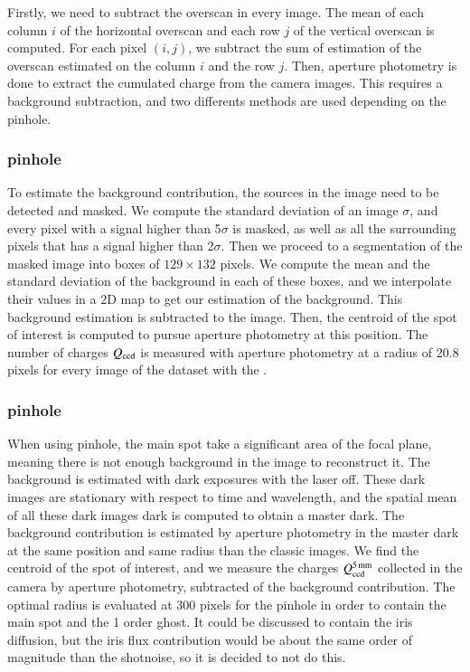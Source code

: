 Firstly, we need to subtract the overscan in every image. The mean of each column $i$ of the horizontal overscan and each row $j$ of the vertical overscan is computed. For each pixel $(i, j)$, we subtract the sum of estimation of the overscan estimated on the column $i$ and the row $j$.
Then, aperture photometry is done to extract the cumulated charge from the \SD camera images. This requires a background subtraction, and two differents methods are used depending on the pinhole.

\subsubsection{\spinhole pinhole}

To estimate the background contribution, the sources in the image need to be detected and masked. We compute the standard deviation of an image $\sigma$, and every pixel with a signal higher than 5$\sigma$ is masked, as well as all the surrounding pixels that has a signal higher than 2$\sigma$. Then we proceed to a segmentation of the masked image into boxes of $129\times132$ pixels. We compute the mean and the standard deviation of the background in each of these boxes, and we interpolate their values in a 2D map to get our estimation of the background. This background estimation is subtracted to the image. Then, the centroid of the spot of interest is computed to pursue aperture photometry at this position. The number of charges $Q_{\mathrm{ccd}}$ is measured with aperture photometry at a radius of 20.8 pixels for every image of the dataset with the \spinhole.

\subsubsection{\bpinhole pinhole}

When using \bpinhole pinhole, the main spot take a significant area of the focal plane, meaning there is not enough background in the image to reconstruct it. The background is estimated with dark exposures with the laser off. These dark images are stationary with respect to time and wavelength, and the spatial mean of all these dark images dark is computed to obtain a master dark. The background contribution is estimated by aperture photometry in the master dark at the same position and same radius than the classic images. We find the centroid of the spot of interest, and we measure the charges $Q_{\mathrm{ccd}}^{\SI{5}{\milli\meter}}$ collected in the \SD camera by aperture photometry, subtracted of the background contribution. The optimal radius is evaluated at 300 pixels for the \bpinhole pinhole in order to contain the main spot and the 1 order ghost. It could be discussed to contain the iris diffusion, but the iris flux contribution would be about the same order of magnitude than the shotnoise, so it is decided to not do this.

